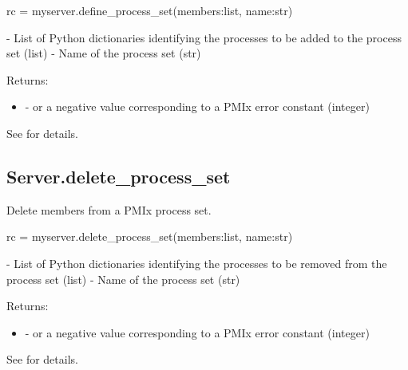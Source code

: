 \format

\pyspecificstart
\begin{codepar}
rc = myserver.define_process_set(members:list, name:str)
\end{codepar}
\pyspecificend


\begin{arglist}
 - List of Python  dictionaries identifying the processes to be added to the process set (list)
 - Name of the process set (str)
\end{arglist}

Returns:

\begin{itemize}
    \item {} -  or a negative value corresponding to a PMIx error constant (integer)
\end{itemize}

See  for details.


\subsection{Server.delete_process_set}

\summary
Delete members from a \ac{PMIx} process set.

\format

\pyspecificstart
\begin{codepar}
rc = myserver.delete_process_set(members:list, name:str)
\end{codepar}
\pyspecificend


\begin{arglist}
 - List of Python  dictionaries identifying the processes to be removed from the process set (list)
 - Name of the process set (str)
\end{arglist}

Returns:

\begin{itemize}
    \item {} -  or a negative value corresponding to a PMIx error constant (integer)
\end{itemize}

See  for details.


